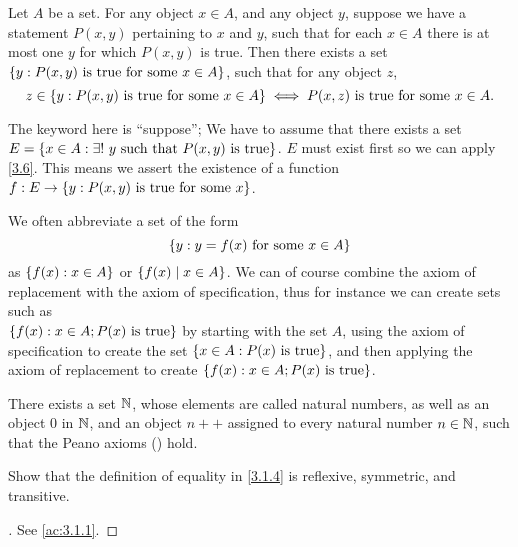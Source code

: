 \begin{ax}[Replacement]\label{3.6}
  Let \(A\) be a set.
  For any object \(x \in A\), and any object \(y\), suppose we have a statement \(P(x, y)\) pertaining to \(x\) and \(y\), such that for each \(x \in A\) there is at most one \(y\) for which \(P(x, y)\) is true.
  Then there exists a set \(\left\lbrace y : P(x, y) \text{ is true for some } x \in A\right\rbrace\), such that for any object \(z\),
  \[
    z \in \left\lbrace y: P(x, y) \text{ is true for some } x \in A\right\rbrace \iff P(x, z) \text{ is true for some } x \in A.
  \]
\end{ax}

\begin{note}
  The keyword here is ``suppose'';
  We have to assume that there exists a set \(E = \left\lbrace x \in A : \exists!\ y \text{ such that } P(x, y) \text{ is true}\right\rbrace\).
  \(E\) must exist first so we can apply \cref{3.6}.
  This means we assert the existence of a function \(f : E \to \left\lbrace y : P(x, y) \text{ is true for some } x\right\rbrace\).
\end{note}

\begin{note}
  We often abbreviate a set of the form
  \[
    \left\lbrace y : y = f(x) \text{ for some } x \in A\right\rbrace
  \]
  as \(\left\lbrace f(x) : x \in A\right\rbrace\) or \(\left\lbrace f(x) \mid x \in A\right\rbrace\).
  We can of course combine the axiom of replacement with the axiom of specification, thus for instance we can create sets such as \\
  \(\left\lbrace f(x) : x \in A; P(x) \text{ is true}\right\rbrace\) by starting with the set \(A\), using the axiom of specification to create the set \(\left\lbrace x \in A : P(x) \text{ is true}\right\rbrace\), and then applying the axiom of replacement to create \(\left\lbrace f(x) : x \in A; P(x) \text{ is true}\right\rbrace\).
\end{note}

\begin{ax}[Infinity]\label{3.7}
  There exists a set \(\mathbb{N}\), whose elements are called natural numbers, as well as an object \(0\) in \(\mathbb{N}\), and an object \(n++\) assigned to every natural number \(n \in \mathbb{N}\), such that the Peano axioms () hold.
\end{ax}

\exercisesection

\begin{ex}\label{ex:3.1.1}
  Show that the definition of equality in \cref{3.1.4} is reflexive, symmetric, and transitive.
\end{ex}

\begin{proof}[]
  See \cref{ac:3.1.1}.
\end{proof}

